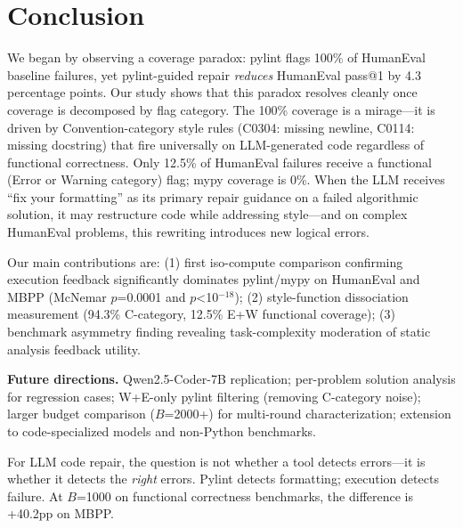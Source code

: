 \section{Conclusion}
\label{sec:conclusion}

We began by observing a coverage paradox: pylint flags 100\% of HumanEval baseline failures, yet pylint-guided repair \emph{reduces} HumanEval pass@1 by 4.3 percentage points. Our study shows that this paradox resolves cleanly once coverage is decomposed by flag category. The 100\% coverage is a mirage---it is driven by Convention-category style rules (C0304: missing newline, C0114: missing docstring) that fire universally on LLM-generated code regardless of functional correctness. Only 12.5\% of HumanEval failures receive a functional (Error or Warning category) flag; mypy coverage is 0\%. When the LLM receives ``fix your formatting'' as its primary repair guidance on a failed algorithmic solution, it may restructure code while addressing style---and on complex HumanEval problems, this rewriting introduces new logical errors.

Our main contributions are: (1) first iso-compute comparison confirming execution feedback significantly dominates pylint/mypy on HumanEval and MBPP (McNemar $p$=0.0001 and $p$<10$^{-18}$); (2) style-function dissociation measurement (94.3\% C-category, 12.5\% E+W functional coverage); (3) benchmark asymmetry finding revealing task-complexity moderation of static analysis feedback utility.

\textbf{Future directions.} Qwen2.5-Coder-7B replication; per-problem solution analysis for regression cases; W+E-only pylint filtering (removing C-category noise); larger budget comparison ($B$=2000+) for multi-round characterization; extension to code-specialized models and non-Python benchmarks.

For LLM code repair, the question is not whether a tool detects errors---it is whether it detects the \emph{right} errors. Pylint detects formatting; execution detects failure. At $B$=1000 on functional correctness benchmarks, the difference is +40.2pp on MBPP.
